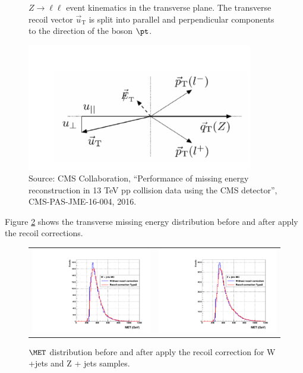 \begin{figure}[!ht]
\caption{$Z\rightarrow \ell \ell$ event kinematics in the transverse plane. The transverse recoil vector $\vec{u}_{\mathrm{T}}$ is split into parallel and perpendicular components to the direction of the boson $\pt$. }
\begin{center}
  \includegraphics[width=280pt]{Chapter5_plots/recoil.pdf}
\end{center}
\caption*{Source: CMS Collaboration, “Performance of missing energy reconstruction in 13
TeV pp collision data using the CMS detector”, CMS-PAS-JME-16-004, 2016.}
\label{fig:recoil01}
\end{figure}

Figure \ref{fig:METrecoil} shows the transverse missing energy distribution before and after apply the recoil corrections.

\begin{figure}[!ht]
\caption{$\MET$ distribution before and after apply the recoil correction for W +jets and Z + jets samples.}
\begin{tabular}{cc}
  \includegraphics[width=230pt]{figuresARC/recoil/compRecoilCorrWjetsARC.pdf} &
  \includegraphics[width=230pt]{figuresARC/recoil/compRecoilCorrZjetsARC.pdf} \\
\end{tabular}
\label{fig:METrecoil}
\end{figure}




